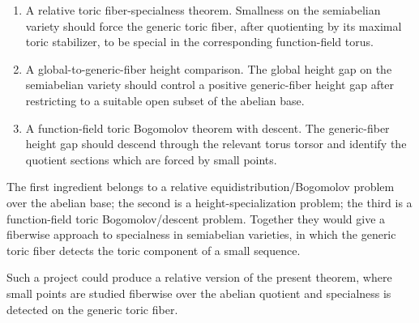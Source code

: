 \documentclass[10pt,a4paper]{amsart}
\theoremstyle{plain}
\theoremstyle{plain}
\numberwithin{equation}{section}
\begin{document}
\begin{enumerate}[label=\textup{(\roman*)},leftmargin=2em]
	\item A relative toric fiber-specialness theorem.  Smallness on the
	semiabelian variety should force the generic toric fiber, after quotienting by
	its maximal toric stabilizer, to be special in the corresponding
	function-field torus.
	
	\item A global-to-generic-fiber height comparison.  The global height gap on
	the semiabelian variety should control a positive generic-fiber height gap
	after restricting to a suitable open subset of the abelian base.
	
	\item A function-field toric Bogomolov theorem with descent.  The generic-fiber
	height gap should descend through the relevant torus torsor and identify the
	quotient sections which are forced by small points.
\end{enumerate}

The first ingredient belongs to a relative equidistribution/Bogomolov problem
over the abelian base; the second is a height-specialization problem; the
third is a function-field toric Bogomolov/descent problem.  Together they
would give a fiberwise approach to specialness in semiabelian varieties, in
which the generic toric fiber detects the toric component of a small sequence.

Such a project could produce a relative version of the present theorem, where
small points are studied fiberwise over the abelian quotient and specialness is
detected on the generic toric fiber.

	
\end{document}
